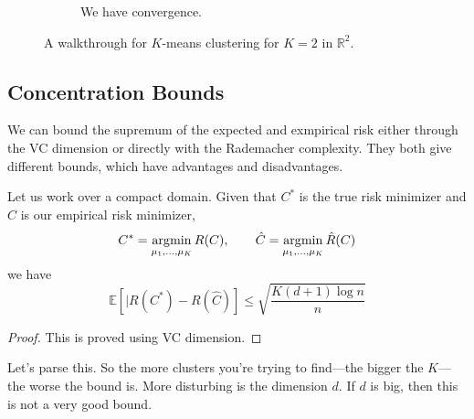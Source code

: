 \begin{example}
\begin{figure}[H]
\begin{subfigure}[b]{0.48\textwidth}
        \caption{We have convergence.}
      \end{subfigure}
      \caption{A walkthrough for $K$-means clustering for $K = 2$ in $\mathbb{R}^2$.}
      \label{fig:kmeans}
    \end{figure}
  \end{example}

\subsection{Concentration Bounds}

  We can bound the supremum of the expected and exmpirical risk either through the VC dimension or directly with the Rademacher complexity. They both give different bounds, which have advantages and disadvantages. 

  \begin{theorem}
    \label{thm:excess-risk-of-the-empirical-minimizer}
    Let us work over a compact domain. Given that $C^\ast$ is the true risk minimizer and $\hat{C}$ is our empirical risk minimizer, 
    \begin{equation}
      C^\ast = \operatorname*{\arg\!\min}_{\mu_1, \ldots, \mu_K} R(C), \qquad \hat{C} = \operatorname*{\arg\!\min}_{\mu_1, \ldots, \mu_K} \hat{R}(C) 
    \end{equation}
    we have 
    \begin{equation}
      \mathbb{E} \left[ | R(C^\ast) - R(\hat{C}) \right] \leq \sqrt{\frac{K (d+1) \log{n}}{n}}
    \end{equation}
  \end{theorem}
  \begin{proof}
    This is proved using VC dimension. 
  \end{proof}

  Let's parse this. So the more clusters you're trying to find---the bigger the $K$---the worse the bound is. More disturbing is the dimension $d$. If $d$ is big, then this is not a very good bound. 

